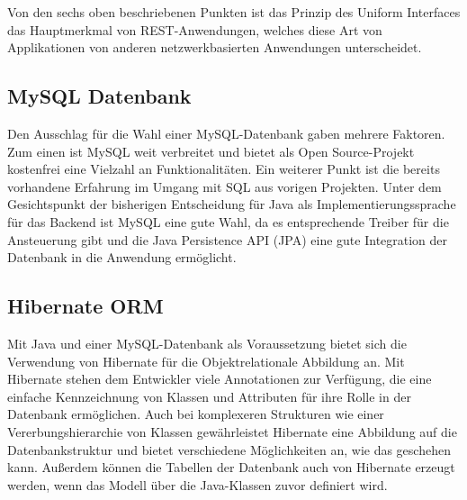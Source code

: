 Von den sechs oben beschriebenen Punkten ist das Prinzip des Uniform Interfaces das Hauptmerkmal von REST-Anwendungen, welches diese Art von Applikationen von anderen netzwerkbasierten Anwendungen unterscheidet.

\subsection{MySQL Datenbank}
Den Ausschlag für die Wahl einer MySQL-Datenbank gaben mehrere Faktoren. Zum einen ist MySQL weit verbreitet und bietet als Open Source-Projekt kostenfrei eine Vielzahl an Funktionalitäten.
Ein weiterer Punkt ist die bereits vorhandene Erfahrung im Umgang mit SQL aus vorigen Projekten.
Unter dem Gesichtspunkt der bisherigen Entscheidung für Java als Implementierungssprache für das Backend ist MySQL eine gute Wahl, da es entsprechende Treiber für die Ansteuerung gibt und die Java Persistence API (\acs{JPA}) eine gute Integration der Datenbank in die Anwendung ermöglicht.

\subsection{Hibernate ORM}
Mit Java und einer MySQL-Datenbank als Voraussetzung bietet sich die Verwendung von Hibernate für die Objektrelationale Abbildung an.
Mit Hibernate stehen dem Entwickler viele Annotationen zur Verfügung, die eine einfache Kennzeichnung von Klassen und Attributen für ihre Rolle in der Datenbank ermöglichen.
Auch bei komplexeren Strukturen wie einer Vererbungshierarchie von Klassen gewährleistet Hibernate eine Abbildung auf die Datenbankstruktur und bietet verschiedene Möglichkeiten an, wie das geschehen kann.
Außerdem können die Tabellen der Datenbank auch von Hibernate erzeugt werden, wenn das Modell über die Java-Klassen zuvor definiert wird.
